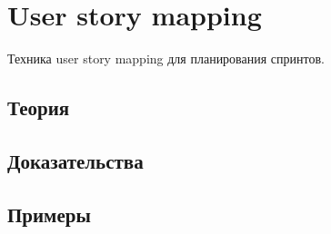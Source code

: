 
\section{User story mapping}
\label{sec:2.6.09-user-story-mapping}

\begin{ticket}
Техника user story mapping для планирования спринтов.
\end{ticket}

\subsection*{Теория}

\subsection*{Доказательства}

\subsection*{Примеры}
